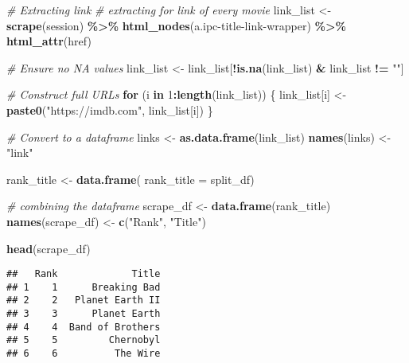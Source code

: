 \documentclass[
]{article}
\newenvironment{Shaded}{\begin{snugshade}}{\end{snugshade}}
\newcommand{\AttributeTok}[1]{\textcolor[rgb]{0.13,0.29,0.53}{#1}}
\newcommand{\CommentTok}[1]{\textcolor[rgb]{0.56,0.35,0.01}{\textit{#1}}}
\newcommand{\ControlFlowTok}[1]{\textcolor[rgb]{0.13,0.29,0.53}{\textbf{#1}}}
\newcommand{\DecValTok}[1]{\textcolor[rgb]{0.00,0.00,0.81}{#1}}
\newcommand{\FunctionTok}[1]{\textcolor[rgb]{0.13,0.29,0.53}{\textbf{#1}}}
\newcommand{\NormalTok}[1]{#1}
\newcommand{\OtherTok}[1]{\textcolor[rgb]{0.56,0.35,0.01}{#1}}
\newcommand{\SpecialCharTok}[1]{\textcolor[rgb]{0.81,0.36,0.00}{\textbf{#1}}}
\newcommand{\StringTok}[1]{\textcolor[rgb]{0.31,0.60,0.02}{#1}}
\begin{document}
\begin{Shaded}
\begin{Highlighting}[]
\CommentTok{\# Extracting link}
\CommentTok{\# extracting for link of every movie}
\NormalTok{link\_list }\OtherTok{\textless{}{-}} \FunctionTok{scrape}\NormalTok{(session) }\SpecialCharTok{\%\textgreater{}\%}
  \FunctionTok{html\_nodes}\NormalTok{(}\StringTok{\textquotesingle{}a.ipc{-}title{-}link{-}wrapper\textquotesingle{}}\NormalTok{) }\SpecialCharTok{\%\textgreater{}\%} 
  \FunctionTok{html\_attr}\NormalTok{(}\StringTok{\textquotesingle{}href\textquotesingle{}}\NormalTok{) }

\CommentTok{\# Ensure no NA values}
\NormalTok{link\_list }\OtherTok{\textless{}{-}}\NormalTok{ link\_list[}\SpecialCharTok{!}\FunctionTok{is.na}\NormalTok{(link\_list) }\SpecialCharTok{\&}\NormalTok{ link\_list }\SpecialCharTok{!=} \StringTok{""}\NormalTok{]}

\CommentTok{\# Construct full URLs}
\ControlFlowTok{for}\NormalTok{ (i }\ControlFlowTok{in} \DecValTok{1}\SpecialCharTok{:}\FunctionTok{length}\NormalTok{(link\_list)) \{}
\NormalTok{  link\_list[i] }\OtherTok{\textless{}{-}} \FunctionTok{paste0}\NormalTok{(}\StringTok{"https://imdb.com"}\NormalTok{, link\_list[i])}
\NormalTok{\}}

\CommentTok{\# Convert to a dataframe}
\NormalTok{links }\OtherTok{\textless{}{-}} \FunctionTok{as.data.frame}\NormalTok{(link\_list)}
\FunctionTok{names}\NormalTok{(links) }\OtherTok{\textless{}{-}} \StringTok{"link"}

\NormalTok{rank\_title }\OtherTok{\textless{}{-}} \FunctionTok{data.frame}\NormalTok{(}
  \AttributeTok{rank\_title =}\NormalTok{ split\_df)}

\CommentTok{\# combining the dataframe}
\NormalTok{scrape\_df }\OtherTok{\textless{}{-}} \FunctionTok{data.frame}\NormalTok{(rank\_title)}
\FunctionTok{names}\NormalTok{(scrape\_df) }\OtherTok{\textless{}{-}} \FunctionTok{c}\NormalTok{(}\StringTok{"Rank"}\NormalTok{, }\StringTok{"Title"}\NormalTok{)}

\FunctionTok{head}\NormalTok{(scrape\_df)}
\end{Highlighting}
\end{Shaded}

\begin{verbatim}
##   Rank             Title
## 1    1      Breaking Bad
## 2    2   Planet Earth II
## 3    3      Planet Earth
## 4    4  Band of Brothers
## 5    5         Chernobyl
## 6    6          The Wire
\end{verbatim}
\end{document}

